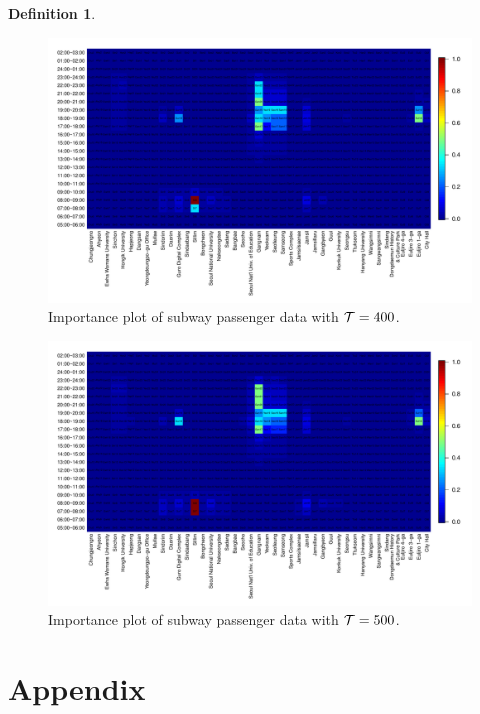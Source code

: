 \documentclass[preprint, review, 12pt]{article}
\theoremstyle{definition}
\newtheorem{dfn}{Definition}
\theoremstyle{remark}
\begin{document}
\begin{dfn}
\begin{figure}
	\centering
	\includegraphics[width=1.05\textwidth]{Fig/In_scale_5.pdf}
	\vspace{-13mm}
	\caption{Importance plot of subway passenger data with ${\cal T}=400$.}
	\label{snow:subway_in_4}
\end{figure}	

\begin{figure}
	\centering
	\includegraphics[width=1.05\textwidth]{Fig/In_scale_6.pdf}
	\vspace{-13mm}
	\caption{Importance plot of subway passenger data with ${\cal T}=500$.}
	\label{snow:subway_in_5}
\end{figure}	


\section*{Appendix}

\end{dfn}
\end{document}
